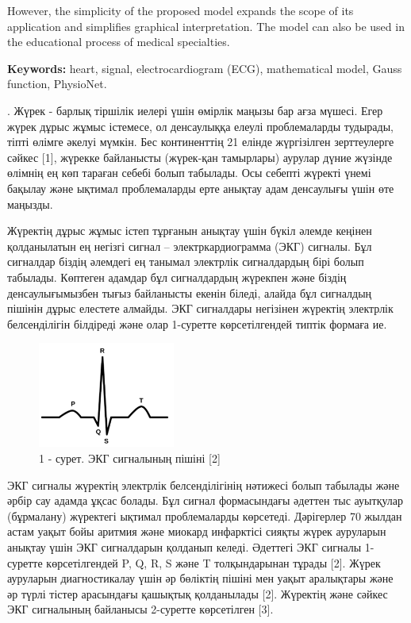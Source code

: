 However, the simplicity of the proposed model expands the scope of its
application and simplifies graphical interpretation. The model can also
be used in the educational process of medical specialties.

{\bfseries Keywords:} heart, signal, electrocardiogram (ECG), mathematical
model, Gauss function, PhysioNet.

\begin{multicols}{2}
. Жүрек - барлық тіршілік иелері үшін өмірлік маңызы бар
ағза мүшесі. Егер жүрек дұрыс жұмыс істемесе, ол денсаулыққа елеулі
проблемаларды тудырады, тіпті өлімге әкелуі мүмкін. Бес континенттің 21
елінде жүргізілген зерттеулерге сәйкес {[}1{]}, жүрекке байланысты
(жүрек-қан тамырлары) аурулар дүние жүзінде өлімнің ең көп тараған
себебі болып табылады. Осы себепті жүректі үнемі бақылау және ықтимал
проблемаларды ерте анықтау адам денсаулығы үшін өте маңызды.

Жүректің дұрыс жұмыс істеп тұрғанын анықтау үшін бүкіл әлемде кеңінен
қолданылатын ең негізгі сигнал -- электркардиограмма (ЭКГ) сигналы. Бұл
сигналдар біздің әлемдегі ең танымал электрлік сигналдардың бірі болып
табылады. Көптеген адамдар бұл сигналдардың жүрекпен және біздің
денсаулығымызбен тығыз байланысты екенін біледі, алайда бұл сигналдың
пішінін дұрыс елестете алмайды. ЭКГ сигналдары негізінен жүректің
электрлік белсенділігін білдіреді және олар 1-суретте көрсетілгендей
типтік формаға ие.
\end{multicols}

\begin{figure}[H]
	\centering
	\includegraphics[width=0.4\textwidth]{media/ict/image40}
	\caption*{1 - сурет. ЭКГ сигналының пішіні {[}2{]}}
\end{figure}

\begin{multicols}{2}
ЭКГ сигналы жүректің электрлік белсенділігінің нәтижесі болып табылады
және әрбір сау адамда ұқсас болады. Бұл сигнал формасындағы әдеттен тыс
ауытқулар (бұрмалану) жүректегі ықтимал проблемаларды көрсетеді.
Дәрігерлер 70 жылдан астам уақыт бойы аритмия және миокард инфарктісі
сияқты жүрек ауруларын анықтау үшін ЭКГ сигналдарын қолданып келеді.
Әдеттегі ЭКГ сигналы 1-суретте көрсетілгендей P, Q, R, S және T
толқындарынан тұрады {[}2{]}. Жүрек ауруларын диагностикалау үшін әр
бөліктің пішіні мен уақыт аралықтары және әр түрлі тістер арасындағы
қашықтық қолданылады {[}2{]}. Жүректің және сәйкес ЭКГ сигналының
байланысы 2-суретте көрсетілген {[}3{]}.
\end{multicols}

